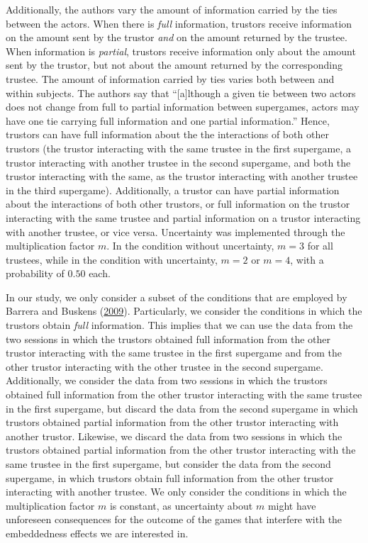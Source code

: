 \documentclass[
  11pt,
]{article}
\begin{document}
Additionally, the authors vary the amount of information carried by the ties between the actors. When there is \emph{full} information, trustors receive information on the amount sent by the trustor \emph{and} on the amount returned by the trustee. When information is \emph{partial}, trustors receive information only about the amount sent by the trustor, but not about the amount returned by the corresponding trustee. The amount of information carried by ties varies both between and within subjects. The authors say that ``{[}a{]}lthough a given tie between two actors does not change from full to partial information between supergames, actors may have one tie carrying full information and one partial information.'' Hence, trustors can have full information about the the interactions of both other trustors (the trustor interacting with the same trustee in the first supergame, a trustor interacting with another trustee in the second supergame, and both the trustor interacting with the same, as the trustor interacting with another trustee in the third supergame). Additionally, a trustor can have partial information about the interactions of both other trustors, or full information on the trustor interacting with the same trustee and partial information on a trustor interacting with another trustee, or vice versa. Uncertainty was implemented through the multiplication factor \(m\). In the condition without uncertainty, \(m = 3\) for all trustees, while in the condition with uncertainty, \(m = 2\) or \(m = 4\), with a probability of \(0.50\) each.

In our study, we only consider a subset of the conditions that are employed by Barrera and Buskens (\protect\hyperlink{ref-barrera_buskens_third_2009}{2009}). Particularly, we consider the conditions in which the trustors obtain \emph{full} information.
This implies that we can use the data from the two sessions in which the trustors obtained full information from the other trustor interacting with the same trustee in the first supergame and from the other trustor interacting with the other trustee in the second supergame.
Additionally, we consider the data from two sessions in which the trustors obtained full information from the other trustor interacting with the same trustee in the first supergame, but discard the data from the second supergame in which trustors obtained partial information from the other trustor interacting with another trustor.
Likewise, we discard the data from two sessions in which the trustors obtained partial information from the other trustor interacting with the same trustee in the first supergame, but consider the data from the second supergame, in which trustors obtain full information from the other trustor interacting with another trustee.
We only consider the conditions in which the multiplication factor \(m\) is constant, as uncertainty about \(m\) might have unforeseen consequences for the outcome of the games that interfere with the embeddedness effects we are interested in.
\end{document}
